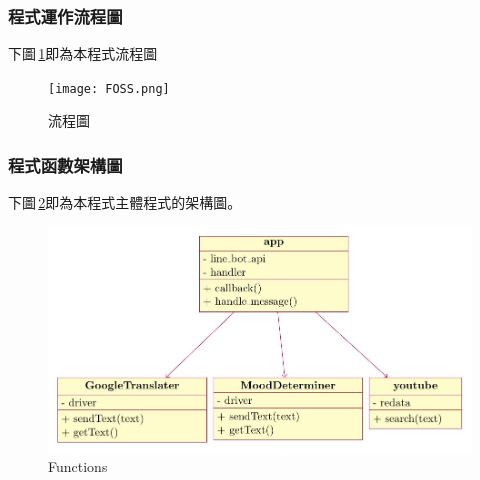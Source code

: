 \documentclass{beamer}
\begin{document}
\begin{CJK}{UTF8}{<font>}
\begin{frame}
\frametitle{程式運作流程圖}
下圖\,\ref{fig:1}即為本程式流程圖

\begin{figure}
\texttt{[image: FOSS.png]}
\caption{流程圖}
\label{fig:1}
\end{figure}


\end{frame}


\begin{frame}
\frametitle{程式函數架構圖}
下圖\,\ref{fig:2}即為本程式主體程式的架構圖。

\begin{figure}
\includegraphics[width=1\linewidth]{function.jpg}
\caption{Functions}
\label{fig:2}
\end{figure}


\end{frame}


\end{CJK}
\end{document}
